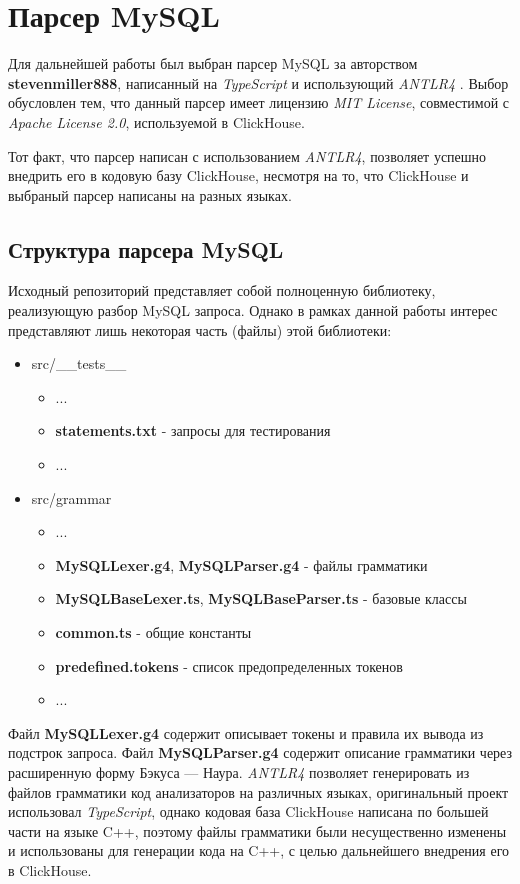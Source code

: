 \section{Парсер MySQL} \label{chap:mysql}
Для дальнейшей работы был выбран парсер MySQL за авторством \textbf{stevenmiller888}, написанный на \textit{TypeScript} и использующий \textit{ANTLR4} \cite{mysql_parser}. Выбор обусловлен тем, что данный парсер имеет лицензию \textit{MIT License}, совместимой с \textit{Apache License 2.0}, используемой в ClickHouse.

Тот факт, что парсер написан с использованием \textit{ANTLR4}, позволяет успешно внедрить его в кодовую базу ClickHouse, несмотря на то, что ClickHouse и выбраный парсер написаны на разных языках.

\subsection{Структура парсера MySQL}
Исходный репозиторий представляет собой полноценную библиотеку, реализующую разбор MySQL запроса. Однако в рамках данной работы интерес представляют лишь некоторая часть (файлы) этой библиотеки:
\begin{itemize}
    \item src/\_\_tests\_\_
    \begin{itemize}
        \item ...
        \item \textbf{statements.txt} - запросы для тестирования
        \item ...
    \end{itemize}
    \item src/grammar
    \begin{itemize}
        \item ...
        \item \textbf{MySQLLexer.g4}, \textbf{MySQLParser.g4} - файлы грамматики
        \item \textbf{MySQLBaseLexer.ts}, \textbf{MySQLBaseParser.ts} - базовые классы
        \item \textbf{common.ts} - общие константы
        \item \textbf{predefined.tokens} - список предопределенных токенов
        \item ...
    \end{itemize}
\end{itemize}

\pagebreak

Файл \textbf{MySQLLexer.g4} содержит описывает токены и правила их вывода из подстрок запроса. Файл \textbf{MySQLParser.g4} содержит описание грамматики через расширенную форму Бэкуса — Наура. \textit{ANTLR4} позволяет генерировать из файлов грамматики код анализаторов на различных языках, оригинальный проект использовал \textit{TypeScript}, однако кодовая база ClickHouse написана по большей части на языке C++, поэтому файлы грамматики были несущественно изменены и использованы для генерации кода на C++, с целью дальнейшего внедрения его в ClickHouse.

